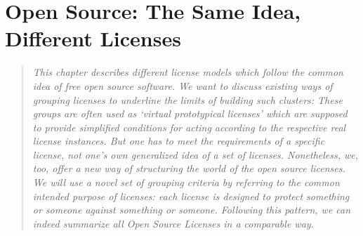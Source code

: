 %
%
%
%
%

\chapter{Open Source: The Same Idea, Different Licenses}\label{sec:LicenseTaxonomies}

\footnotesize \begin{quote}\itshape This chapter describes different license
models which follow the common idea of free open source software. We want to
discuss existing ways of grouping licenses to underline the limits of building
such clusters: These groups are often used as `virtual prototypical licenses'
which are supposed to provide simplified conditions for acting according to
the respective real license instances. But one has to meet the requirements of a
specific license, not one's own generalized idea of a set of licenses.
Nonetheless, we, too,  offer a new way of structuring the world of the open
source licenses. We will use a novel set of grouping criteria by referring
to the common intended purpose of licenses: each license is designed to protect
something or someone against something or someone. Following this pattern, we
can indeed summarize all Open Source Licenses in a comparable way.
\end{quote}
\normalsize{}

